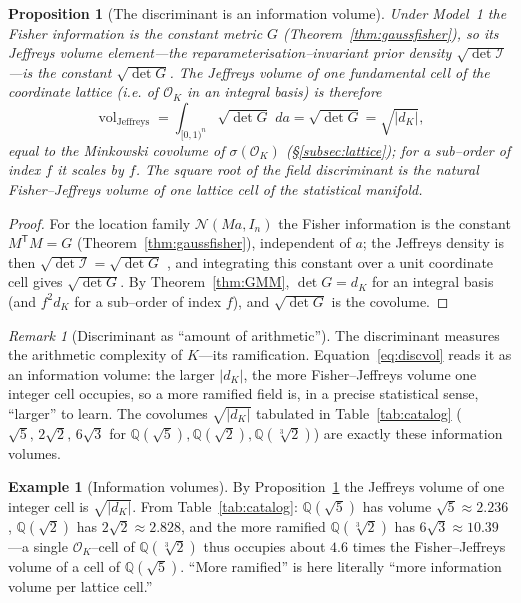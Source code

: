 \documentclass[11pt]{article}
\theoremstyle{plain}
\newtheorem{proposition}[theorem]{Proposition}
\theoremstyle{definition}
\newtheorem{example}[theorem]{Example}
\theoremstyle{remark}
\newtheorem{remark}[theorem]{Remark}
\newcommand{\Q}{\mathbb{Q}}
\newcommand{\K}{K}
\newcommand{\OK}{\mathcal{O}_K}
\newcommand{\Fish}{\mathcal{I}}
\newcommand{\GG}{G}
\newcommand{\transpose}{^{\mathsf{T}}}
\begin{document}
\begin{proposition}[The discriminant is an information volume]\label{prop:discvol}
Under Model~1 the Fisher information is the constant metric $\GG$ (Theorem~\ref{thm:gaussfisher}), so its
\emph{Jeffreys volume element}---the reparameterisation--invariant prior density $\sqrt{\det\Fish}$
\cite{Jeffreys}---is the constant $\sqrt{\det\GG}$. The Jeffreys volume of one fundamental cell of the
coordinate lattice (i.e. of $\OK$ in an integral basis) is therefore
\begin{equation}\label{eq:discvol}
  \operatorname{vol}_{\mathrm{Jeffreys}}=\int_{[0,1)^n}\!\sqrt{\det\GG}\,\,da=\sqrt{\det\GG}=\sqrt{|d_\K|},
\end{equation}
equal to the Minkowski covolume of $\sigma(\OK)$ (\S\ref{subsec:lattice}); for a sub--order of index $f$ it
scales by $f$. The square root of the field discriminant is the natural Fisher--Jeffreys volume of one lattice
cell of the statistical manifold.
\end{proposition}
\begin{proof}
For the location family $\mathcal N(Ma,I_n)$ the Fisher information is the constant $M\transpose M=\GG$
(Theorem~\ref{thm:gaussfisher}), independent of $a$; the Jeffreys density is then
$\sqrt{\det\Fish}=\sqrt{\det\GG}$ \cite{Jeffreys}, and integrating this constant over a unit coordinate cell
gives $\sqrt{\det\GG}$. By Theorem~\ref{thm:GMM}, $\det\GG=d_\K$ for an integral basis (and $f^2 d_\K$ for a
sub--order of index $f$), and $\sqrt{\det\GG}$ is the covolume.
\end{proof}

\begin{remark}[Discriminant as ``amount of arithmetic'']\label{rem:discvol}
The discriminant measures the arithmetic complexity of $\K$---its ramification. Equation~\eqref{eq:discvol}
reads it as an information volume: the larger $|d_\K|$, the more Fisher--Jeffreys volume one integer cell
occupies, so a more ramified field is, in a precise statistical sense, ``larger'' to learn. The covolumes
$\sqrt{|d_\K|}$ tabulated in Table~\ref{tab:catalog} ($\sqrt5,\,2\sqrt2,\,6\sqrt3$ for
$\Q(\sqrt5),\Q(\sqrt2),\Q(\sqrt[3]2)$) are exactly these information volumes.
\end{remark}

\begin{example}[Information volumes]\label{ex:jeffreys}
By Proposition~\ref{prop:discvol} the Jeffreys volume of one integer cell is $\sqrt{|d_\K|}$. From
Table~\ref{tab:catalog}: $\Q(\sqrt5)$ has volume $\sqrt5\approx2.236$, $\Q(\sqrt2)$ has
$2\sqrt2\approx2.828$, and the more ramified $\Q(\sqrt[3]2)$ has $6\sqrt3\approx10.39$---a single
$\OK$--cell of $\Q(\sqrt[3]2)$ thus occupies about $4.6$ times the Fisher--Jeffreys volume of a cell of
$\Q(\sqrt5)$. ``More ramified'' is here literally ``more information volume per lattice cell.''
\end{example}
\end{document}
